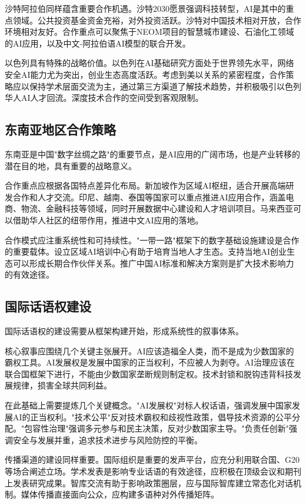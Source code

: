 沙特阿拉伯同样蕴含重要合作机遇。沙特2030愿景强调科技转型，AI是其中的重点领域。公共投资基金资金充裕，对外投资活跃。沙特对中国技术相对开放，合作环境相对友好。合作重点可以聚焦于NEOM项目的智慧城市建设、石油化工领域的AI应用，以及中文-阿拉伯语AI模型的联合开发。

以色列具有特殊的战略价值。以色列在AI基础研究方面处于世界领先水平，网络安全AI能力尤为突出，创业生态高度活跃。考虑到美以关系的紧密程度，合作策略应以保持学术层面交流为主，通过第三方渠道了解技术趋势，并积极吸引以色列华人AI人才回流。深度技术合作的空间受到客观限制。

\subsection{东南亚地区合作策略}

东南亚是中国"数字丝绸之路"的重要节点，是AI应用的广阔市场，也是产业转移的潜在目的地，具有重要的战略意义。

合作重点应根据各国特点差异化布局。新加坡作为区域AI枢纽，适合开展高端研发合作和人才交流。印尼、越南、泰国等国家可以重点推进AI应用合作，涵盖电商、物流、金融科技等领域，同时开展数据中心建设和人才培训项目。马来西亚可以借助华人社区的纽带作用，推进中文AI应用的落地。

合作模式应注重系统性和可持续性。"一带一路"框架下的数字基础设施建设是合作的重要载体。设立区域AI培训中心有助于培育当地人才生态。支持当地AI创业生态可以形成长期合作伙伴关系。推广中国AI标准和解决方案则是扩大技术影响力的有效途径。

\subsection{国际话语权建设}

国际话语权的建设需要从框架构建开始，形成系统性的叙事体系。

核心叙事应围绕几个关键主张展开。AI应该造福全人类，而不是成为少数国家的霸权工具。AI发展权是发展中国家的正当权利，不应被人为剥夺。AI治理应该在联合国框架下进行，不能由少数国家垄断规则制定权。技术封锁和脱钩违背科技发展规律，损害全球共同利益。

在此基础上需要提炼几个关键概念。"AI发展权"对标人权话语，强调发展中国家发展AI的正当权利。"技术公平"反对技术霸权和歧视性政策，倡导技术资源的公平分配。"包容性治理"强调多元参与和民主决策，反对少数国家主导。"负责任创新"强调安全与发展并重，追求技术进步与风险防控的平衡。

传播渠道的建设同样重要。国际组织是重要的发声平台，应充分利用联合国、G20等场合阐述立场。学术发表是影响专业话语的有效途径，应积极在顶级会议和期刊上发表研究成果。智库交流有助于影响政策圈层，应与国际智库建立常态化对话机制。媒体传播直接面向公众，应构建多语种对外传播矩阵。

